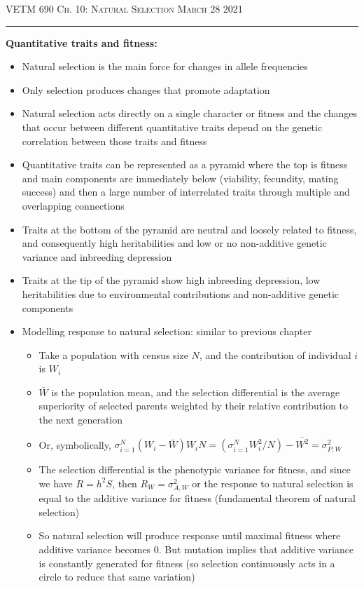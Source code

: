\documentclass[12pt]{amsart}
\begin{document}
\thispagestyle{empty}

{\scshape VETM 690} \hfill {\scshape \Large  Ch. 10: Natural Selection} \hfill {\scshape March 28 2021}
\medskip
\hrule
\bigskip

{\large \bf Quantitative traits and fitness:}
\begin{itemize}
\item Natural selection is the main force for changes in allele frequencies
\item Only selection produces changes that promote adaptation
\item Natural selection acts directly on a single character or fitness and the changes that occur between different quantitative traits depend on the genetic correlation between those traits and fitness
\item Quantitative traits can be represented as a pyramid where the top is fitness and main components are immediately below (viability, fecundity, mating success) and then a large number of interrelated traits through multiple and overlapping connections 
\item Traits at the bottom of the pyramid are neutral and loosely related to fitness, and consequently high heritabilities and low or no non-additive genetic variance and inbreeding depression
\item Traits at the tip of the pyramid show high inbreeding depression, low heritabilities due to environmental contributions and non-additive genetic components
\item Modelling response to natural selection: similar to previous chapter
\begin{itemize}
\item Take a population with census size $N$, and the contribution of individual $i$ is $W_i$
\item $\bar{W}$ is the population mean, and the selection differential is the average superiority of selected parents weighted by their relative contribution to the next generation
\item Or, symbolically, $\sigma_{i=1}^N(W_i-\bar{W})W_iN = (\sigma_{i=1}^NW_i^2/N) - \bar{W^2} = \sigma^2_{P,W}$ 
\item The selection differential is the phenotypic variance for fitness, and since we have $R = h^2S$, then $R_W = \sigma^2_{A,W}$ or the response to natural selection is equal to the additive variance for fitness (fundamental theorem of natural selection)
\item So natural selection will produce response until maximal fitness where additive variance becomes 0. But mutation implies that additive variance is constantly generated for fitness  (so selection continuously acts in a circle to reduce that same variation)

\end{itemize}
\end{itemize}
\end{document}
